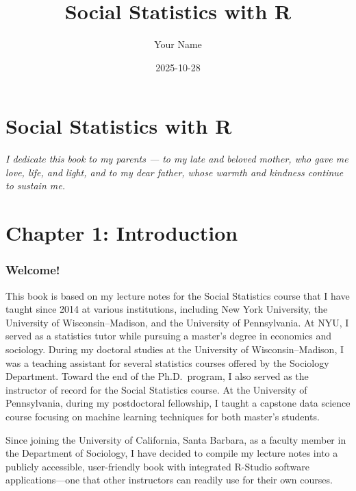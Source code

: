 \documentclass[
  letterpaper,
  DIV=11,
  numbers=noendperiod]{scrreprt}
\title{Social Statistics with R}
\author{Your Name}
\date{2025-10-28}
\renewcommand*\contentsname{Table of contents}
\newcommand\contentsname{Table of contents}
\begin{document}
\maketitle

\renewcommand*\contentsname{Table of contents}
{
\hypersetup{linkcolor=}
\setcounter{tocdepth}{2}
\tableofcontents
}


\chapter{Social Statistics with R}\label{social-statistics-with-r}

\emph{I dedicate this book to my parents --- to my late and beloved
mother, who gave me love, life, and light, and to my dear father, whose
warmth and kindness continue to sustain me.}


\chapter{Chapter 1: Introduction}\label{chapter-1-introduction}

\subsection{Welcome!}\label{welcome}

This book is based on my lecture notes for the Social Statistics course
that I have taught since 2014 at various institutions, including New
York University, the University of Wisconsin--Madison, and the
University of Pennsylvania. At NYU, I served as a statistics tutor while
pursuing a master's degree in economics and sociology. During my
doctoral studies at the University of Wisconsin--Madison, I was a
teaching assistant for several statistics courses offered by the
Sociology Department. Toward the end of the Ph.D.~program, I also served
as the instructor of record for the Social Statistics course. At the
University of Pennsylvania, during my postdoctoral fellowship, I taught
a capstone data science course focusing on machine learning techniques
for both master's students.

Since joining the University of California, Santa Barbara, as a faculty
member in the Department of Sociology, I have decided to compile my
lecture notes into a publicly accessible, user-friendly book with
integrated R-Studio software applications---one that other instructors
can readily use for their own courses.
\end{document}
